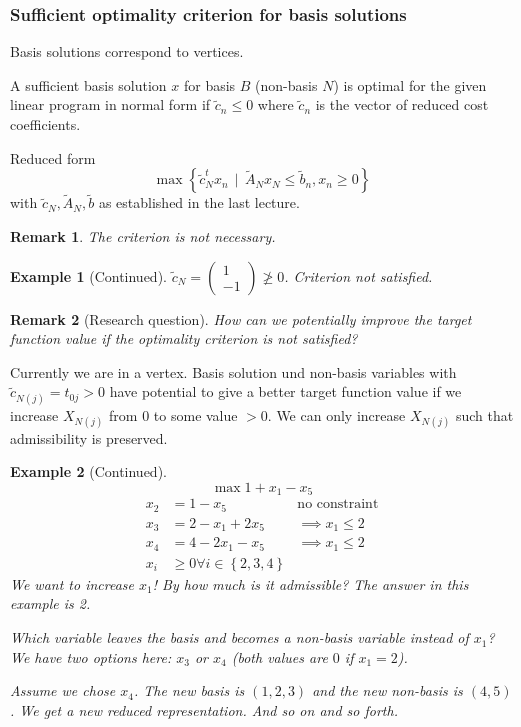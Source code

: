 \documentclass[a4paper]{article}
\numberwithin{lecref}{subsection}
\newtheorem*{Example}{Example}
\newtheorem*{Remark}{Remark}
\newcommand{\Set}[1]{\left\{#1\right\}}
\newcommand{\SetDef}[2]{\left\{#1\,\mid\,#2\right\}}
\begin{document}
\subsubsection{Sufficient optimality criterion for basis solutions}

Basis solutions correspond to vertices.

A sufficient basis solution $x$ for basis $B$ (non-basis $N$) is optimal for the given linear program in normal form
if $\tilde c_n \leq 0$ where $\tilde c_n$ is the vector of reduced cost coefficients.

\begin{mdframed}
	Reduced form
	\[ \max\SetDef{\tilde c_N^t x_n}{\tilde A_N x_N \leq \tilde b_n, x_n \geq 0} \]
	with $\tilde c_N, \tilde A_N, \tilde b$ as established in the last lecture.
\end{mdframed}

\begin{Remark}
	The criterion is not necessary.
\end{Remark}

\begin{Example}[Continued]
	$\tilde c_N = \begin{pmatrix} 1 \\ -1 \end{pmatrix} \not\geq 0$. Criterion not satisfied.
\end{Example}

\begin{Remark}[Research question]
	How can we potentially improve the target function value if the optimality criterion is not satisfied?
\end{Remark}

Currently we are in a vertex. Basis solution und non-basis variables with $\tilde c_{N(j)} = t_{0j} > 0$ have potential to give a better target function value if we increase $X_{N(j)}$ from 0 to some value $>0$.
We can only increase $X_{N(j)}$ such that admissibility is preserved.

\begin{Example}[Continued]
	\[ \max 1 + x_1 - x_5 \]
	\begin{align*}
		x_2 &= 1 - x_5 & \text{no constraint} \\
		x_3 &= 2 - x_1 + 2x_5 & \implies x_1 \leq 2 \\
		x_4 &= 4 - 2x_1 - x_5 & \implies x_1 \leq 2 \\
		x_i &\geq 0 \forall i \in \Set{2, 3, 4}
	\end{align*}
	We want to increase $x_1$! By how much is it admissible? The answer in this example is 2.

	Which variable leaves the basis and becomes a non-basis variable instead of $x_1$?
	We have two options here: $x_3$ or $x_4$ (both values are $0$ if $x_1 = 2$).

	Assume we chose $x_4$. The new basis is $(1, 2, 3)$ and the new non-basis is $(4,5)$. We get a new reduced representation. And so on and so forth.
\end{Example}
\end{document}
